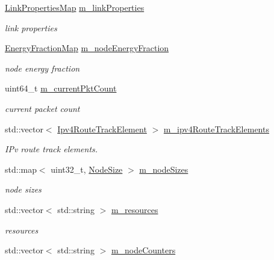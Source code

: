 \begin{DoxyCompactItemize}
\hyperlink{classns3_1_1AnimationInterface_a6b801c7635367ab676b45b476ea3902c}{Link\+Properties\+Map} \hyperlink{classns3_1_1AnimationInterface_a8f40a5be6a97ed9f1e2692a604b27d15}{m\+\_\+link\+Properties}
\begin{DoxyCompactList}\small\item\em link properties \end{DoxyCompactList}\item 
\hyperlink{classns3_1_1AnimationInterface_a868459efb0dd7edd1ec83d7c0f8cd365}{Energy\+Fraction\+Map} \hyperlink{classns3_1_1AnimationInterface_a1950e6f554a84066c7582d9051788eb4}{m\+\_\+node\+Energy\+Fraction}
\begin{DoxyCompactList}\small\item\em node energy fraction \end{DoxyCompactList}\item 
uint64\+\_\+t \hyperlink{classns3_1_1AnimationInterface_ab04001286c72f63783361f1eca515f18}{m\+\_\+current\+Pkt\+Count}
\begin{DoxyCompactList}\small\item\em current packet count \end{DoxyCompactList}\item 
std\+::vector$<$ \hyperlink{structns3_1_1AnimationInterface_1_1Ipv4RouteTrackElement}{Ipv4\+Route\+Track\+Element} $>$ \hyperlink{classns3_1_1AnimationInterface_ae34a5934529aba007040aca4fe7ca0fb}{m\+\_\+ipv4\+Route\+Track\+Elements}
\begin{DoxyCompactList}\small\item\em I\+Pv route track elements. \end{DoxyCompactList}\item 
std\+::map$<$ uint32\+\_\+t, \hyperlink{structns3_1_1AnimationInterface_1_1NodeSize}{Node\+Size} $>$ \hyperlink{classns3_1_1AnimationInterface_a8fc0d0d65d05d892b4638b7382471aa7}{m\+\_\+node\+Sizes}
\begin{DoxyCompactList}\small\item\em node sizes \end{DoxyCompactList}\item 
std\+::vector$<$ std\+::string $>$ \hyperlink{classns3_1_1AnimationInterface_aeb82a7647d51e67201021b0030fb47ba}{m\+\_\+resources}
\begin{DoxyCompactList}\small\item\em resources \end{DoxyCompactList}\item 
std\+::vector$<$ std\+::string $>$ \hyperlink{classns3_1_1AnimationInterface_aac938305b8fa4a4079c4ce15f112a242}{m\+\_\+node\+Counters}

\end{DoxyCompactItemize}
